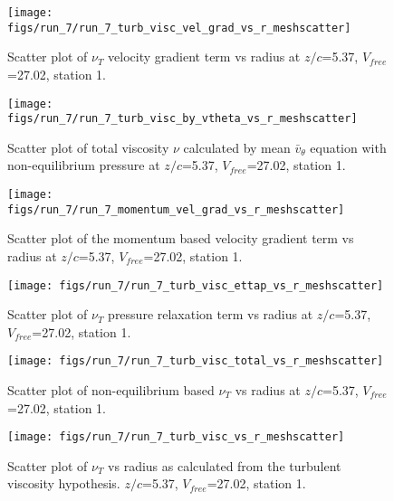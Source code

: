 \begin{figure}[H]
\centering
\texttt{[image: figs/run\_7/run\_7\_turb\_visc\_vel\_grad\_vs\_r\_meshscatter]}
\caption{Scatter plot of $\nu_T$ velocity gradient term vs radius at $z/c$=5.37, $V_{free}$=27.02, station 1.}
\end{figure}


\begin{figure}[H]
\centering
\texttt{[image: figs/run\_7/run\_7\_turb\_visc\_by\_vtheta\_vs\_r\_meshscatter]}
\caption{Scatter plot of total viscosity $\nu$ calculated by mean $\bar{v}_{\theta}$ equation with non-equilibrium pressure at $z/c$=5.37, $V_{free}$=27.02, station 1.}
\end{figure}


\begin{figure}[H]
\centering
\texttt{[image: figs/run\_7/run\_7\_momentum\_vel\_grad\_vs\_r\_meshscatter]}
\caption{Scatter plot of the momentum based velocity gradient term vs radius at $z/c$=5.37, $V_{free}$=27.02, station 1.}
\end{figure}


\begin{figure}[H]
\centering
\texttt{[image: figs/run\_7/run\_7\_turb\_visc\_ettap\_vs\_r\_meshscatter]}
\caption{Scatter plot of $\nu_T$ pressure relaxation term vs radius at $z/c$=5.37, $V_{free}$=27.02, station 1.}
\end{figure}


\begin{figure}[H]
\centering
\texttt{[image: figs/run\_7/run\_7\_turb\_visc\_total\_vs\_r\_meshscatter]}
\caption{Scatter plot of non-equilibrium based $\nu_T$ vs radius at $z/c$=5.37, $V_{free}$=27.02, station 1.}
\end{figure}


\begin{figure}[H]
\centering
\texttt{[image: figs/run\_7/run\_7\_turb\_visc\_vs\_r\_meshscatter]}
\caption{Scatter plot of $\nu_T$ vs radius as calculated from the turbulent viscosity hypothesis. $z/c$=5.37, $V_{free}$=27.02, station 1.}
\end{figure}


